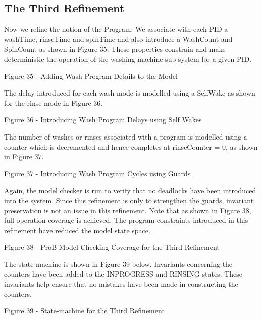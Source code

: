 \subsection{The Third Refinement}
\label{sec:component_diagrams-tutorial_thirdRefinement}
 
Now we refine the notion of the Program. We associate with each PID a washTime, rinseTime and spinTime and also introduce a WashCount and SpinCount as shown in Figure 35. These properties constrain and make deterministic the operation of the washing machine sub-system for a given PID.
 
Figure 35 - Adding Wash Program Details to the Model
 
The delay introduced for each wash mode is modelled using a SelfWake as shown for the rinse mode in Figure 36.
 
Figure 36 - Introducing Wash Program Delays using Self Wakes
 
The number of washes or rinses associated with a program is modelled using a counter which is decremented and hence completes at rinseCounter = 0, as shown in Figure 37.
 
Figure 37 - Introducing Wash Program Cycles using Guards
 
Again, the model checker is run to verify that no deadlocks have been introduced into the system. Since this refinement is only to strengthen the guards, invariant preservation is not an issue in this refinement. Note that as shown in Figure 38, full operation coverage is achieved. The program constraints introduced in this refinement have reduced the model state space. 
 
Figure 38 - ProB Model Checking Coverage for the Third Refinement
 
The state machine is shown in Figure 39 below. Invariants concerning the counters have been added to the INPROGRESS and RINSING states. These invariants help ensure that no mistakes have been made in constructing the counters.
 
Figure 39 - State-machine for the Third Refinement 
 

